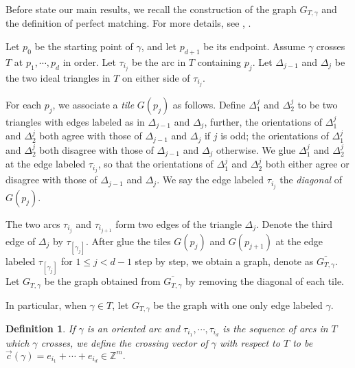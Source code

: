 \documentclass[10pt]{amsart}
\theoremstyle{theorems}
\newtheorem{Definition}[Theorem]{Definition}
\begin{document}
\medskip

Before state our main results, we recall the construction of the graph $G_{T,\gamma}$ and the definition of perfect matching. For more details, see \cite[Section 4]{MSW}, \cite{CS}.

\medskip

Let $p_0$ be the starting point of $\gamma$, and let $p_{d+1}$ be its endpoint. Assume $\gamma$ crosses $T$ at $p_1,\cdots,p_d$ in order.
Let $\tau_{i_j}$ be the arc in $T$ containing $p_j$. Let $\Delta_{j-1}$ and $\Delta_{j}$ be the two ideal triangles in $T$ on either side of $\tau_{i_j}$.

\medskip

For each $p_j$, we associate a \emph{tile} $G(p_j)$ as follows. Define $\Delta_1^j$ and $\Delta_2^j$ to be two triangles with edges labeled as in $\Delta_{j-1}$ and $\Delta_{j}$, further, the orientations of $\Delta_1^j$ and $\Delta_2^j$ both agree with those of $\Delta_{j-1}$ and $\Delta_{j}$ if $j$ is odd; the orientations of $\Delta_1^j$ and $\Delta_2^j$ both disagree with those of $\Delta_{j-1}$ and $\Delta_{j}$ otherwise. We glue $\Delta_1^j$ and $\Delta_2^j$ at the edge labeled $\tau_{i_j}$, so that the orientations of $\Delta_1^j$ and $\Delta_2^j$ both either agree or disagree with those of $\Delta_{j-1}$ and $\Delta_{j}$. We say the edge labeled $\tau_{i_j}$ the \emph{diagonal} of $G(p_j)$.

\medskip

The two arcs $\tau_{i_j}$ and $\tau_{i_{j+1}}$ form two edges of the triangle $\Delta_j$. Denote the third edge of $\Delta_j$ by $\tau_{[\gamma_j]}$. After glue the tiles $G(p_j)$ and $G(p_{j+1})$ at the edge labeled $\tau_{[\gamma_j]}$ for $1\leq j<d-1$ step by step, we obtain a graph, denote as $\overline{G_{T,\gamma}}$. Let $G_{T,\gamma}$ be the graph obtained from $\overline{G_{T,\gamma}}$ by removing the diagonal of each tile.

\medskip

In particular, when $\gamma\in T$, let $G_{T,\gamma}$ be the graph with one only edge labeled $\gamma$.

\medskip

\begin{Definition}

If $\gamma$ is an oriented arc and $\tau_{i_1},\cdots, \tau_{i_d}$ is the sequence of arcs in $T$ which $\gamma$ crosses, we define the \emph{crossing vector} of $\gamma$ with respect to $T$ to be $\vec{c}(\gamma)=e_{i_1}+\cdots+e_{i_d}\in \mathbb Z^{m}.$

\end{Definition}
\end{document}
